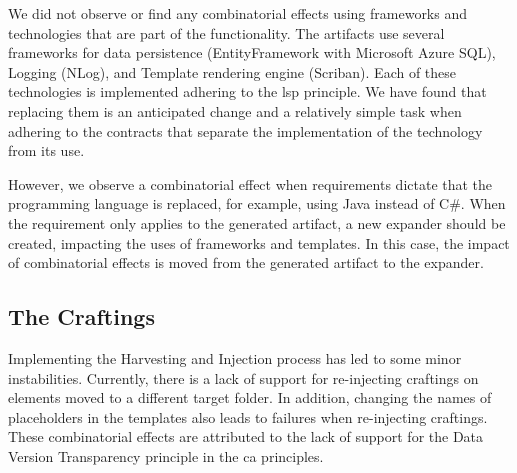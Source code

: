 We did not observe or find any combinatorial effects using frameworks and technologies
that are part of the functionality. The artifacts use several frameworks for data
persistence (EntityFramework with Microsoft Azure SQL), Logging (NLog), and Template
rendering engine (Scriban). Each of these technologies is implemented adhering to the
\gls{lsp} principle. We have found that replacing them is an anticipated change and a
relatively simple task when adhering to the contracts that separate the implementation of
the technology from its use.

However, we observe a combinatorial effect when requirements dictate that the programming
language is replaced, for example, using Java instead of C\#. When the requirement only
applies to the generated artifact, a new expander should be created, impacting the uses of
frameworks and templates. In this case, the impact of combinatorial effects is moved from
the generated artifact to the expander.


\subsection{The Craftings}
Implementing the Harvesting and Injection process has led to some minor instabilities.
Currently, there is a lack of support for re-injecting craftings on elements moved to a
different target folder. In addition, changing the names of placeholders in the templates
also leads to failures when re-injecting craftings. These combinatorial effects are
attributed to the lack of support for the Data Version Transparency principle in the
\gls{ca} principles.